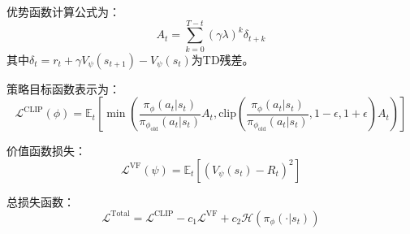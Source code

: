 \documentclass[12pt,a4paper]{article}
\begin{document}
优势函数计算公式为：
\begin{equation}
    \label{eq:gae}
    A_t = \sum_{k=0}^{T-t} (\gamma \lambda)^k \delta_{t+k}
\end{equation}
其中$\delta_t = r_t + \gamma V_\psi(s_{t+1}) - V_\psi(s_t)$为TD残差。

策略目标函数表示为：
\begin{equation}
    \label{eq:ppo_clip}
    \mathcal{L}^{\text{CLIP}}(\phi) = \mathbb{E}_t \left[ \min\left( \frac{\pi_\phi(a_t|s_t)}{\pi_{\phi_{\text{old}}}(a_t|s_t)} A_t, \text{clip}\left( \frac{\pi_\phi(a_t|s_t)}{\pi_{\phi_{\text{old}}}(a_t|s_t)}, 1-\epsilon, 1+\epsilon \right) A_t \right) \right]
\end{equation}

价值函数损失：
\begin{equation}
    \label{eq:value_loss}
    \mathcal{L}^{\text{VF}}(\psi) = \mathbb{E}_t \left[ (V_\psi(s_t) - R_t)^2 \right]
\end{equation}

总损失函数：
\begin{equation}
    \label{eq:ppo_total}
    \mathcal{L}^{\text{Total}} = \mathcal{L}^{\text{CLIP}} - c_1 \mathcal{L}^{\text{VF}} + c_2 \mathcal{H}(\pi_\phi(\cdot|s_t))
\end{equation}
\end{document}
